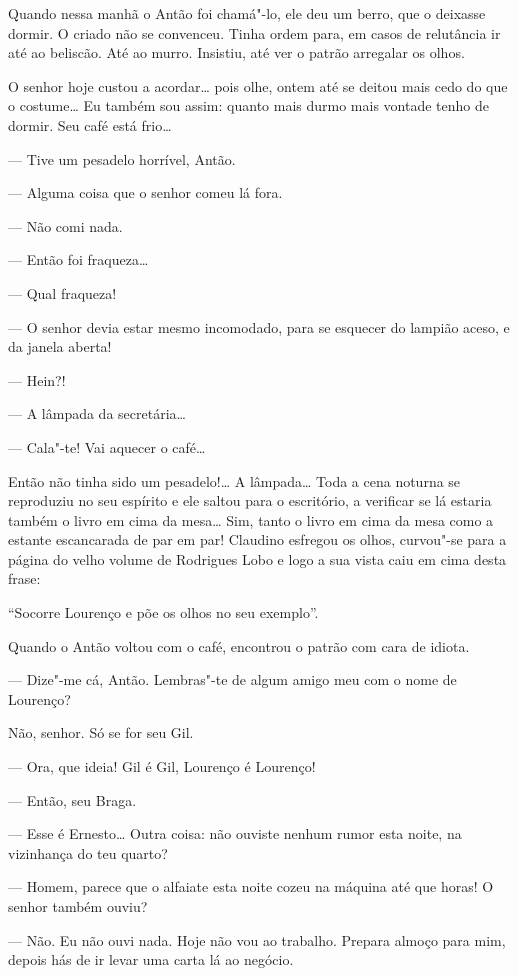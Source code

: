 Quando nessa manhã o Antão foi chamá"-lo, ele deu um berro, que o
deixasse dormir. O criado não se convenceu. Tinha ordem para, em casos
de relutância ir até ao beliscão. Até ao murro. Insistiu, até ver o
patrão arregalar os olhos.

O senhor hoje custou a acordar\ldots{} pois olhe, ontem até se deitou mais
cedo do que o costume\ldots{} Eu também sou assim: quanto mais durmo mais
vontade tenho de dormir. Seu café está frio\ldots{}

--- Tive um pesadelo horrível, Antão.

--- Alguma coisa que o senhor comeu lá fora.

--- Não comi nada.

--- Então foi fraqueza\ldots{}

--- Qual fraqueza!

--- O senhor devia estar mesmo incomodado, para se esquecer do lampião
aceso, e da janela aberta!

--- Hein?!

--- A lâmpada da secretária\ldots{}

--- Cala"-te! Vai aquecer o café\ldots{}

Então não tinha sido um pesadelo!\ldots{} A lâmpada\ldots{} Toda a cena noturna se
reproduziu no seu espírito e ele saltou para o escritório, a verificar
se lá estaria também o livro em cima da mesa\ldots{} Sim, tanto o livro em
cima da mesa como a estante escancarada de par em par! Claudino esfregou
os olhos, curvou"-se para a página do velho volume de Rodrigues Lobo e
logo a sua vista caiu em cima desta frase:

``Socorre Lourenço e põe os olhos no seu exemplo''.

Quando o Antão voltou com o café, encontrou o patrão com cara de idiota.

--- Dize"-me cá, Antão. Lembras"-te de algum amigo meu com o nome de
Lourenço?

Não, senhor. Só se for seu Gil.

--- Ora, que ideia! Gil é Gil, Lourenço é Lourenço!

--- Então, seu Braga.

--- Esse é Ernesto\ldots{} Outra coisa: não ouviste nenhum rumor esta noite,
na vizinhança do teu quarto?

--- Homem, parece que o alfaiate esta noite cozeu na máquina até que
horas! O senhor também ouviu?

--- Não. Eu não ouvi nada. Hoje não vou ao trabalho. Prepara almoço para
mim, depois hás de ir levar uma carta lá ao negócio.

